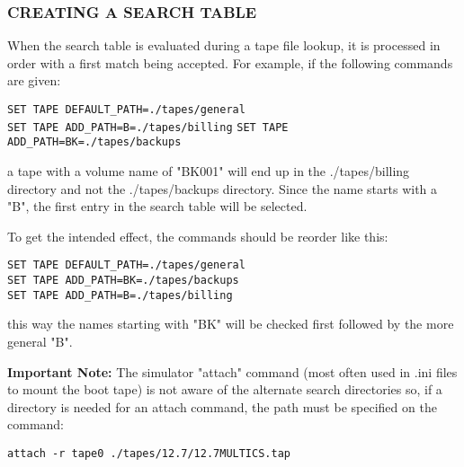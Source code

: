 \subsubsection[Creating a Search Table]{CREATING A SEARCH TABLE}

When the search table is evaluated during a tape file lookup, it is processed in order with a first
match being accepted. For example, if the following commands are given:

\begin{adjustwidth}{5ex}{1ex}
	\texttt{SET TAPE DEFAULT\_PATH=./tapes/general} \\
	\texttt{SET TAPE ADD\_PATH=B=./tapes/billing}
	\texttt{SET TAPE ADD\_PATH=BK=./tapes/backups} \\
\end{adjustwidth}

a tape with a volume name of "BK001" will end up in the ./tapes/billing directory and not the
./tapes/backups directory. Since the name starts with a "B", the first entry in the search table
will be selected.

To get the intended effect, the commands should be reorder like this:

\begin{adjustwidth}{5ex}{1ex}
	\texttt{SET TAPE DEFAULT\_PATH=./tapes/general} \\
	\texttt{SET TAPE ADD\_PATH=BK=./tapes/backups} \\
	\texttt{SET TAPE ADD\_PATH=B=./tapes/billing}
\end{adjustwidth}

this way the names starting with "BK" will be checked first followed by the more general "B".

\textbf{Important Note:} The simulator "attach" command (most often used in .ini files to mount
the boot tape) is not aware of the alternate search directories so, if a directory is needed for
an attach command, the path must be specified on the command:

\begin{adjustwidth}{5ex}{1ex}
	\texttt{attach -r tape0 ./tapes/12.7/12.7MULTICS.tap}
\end{adjustwidth}
